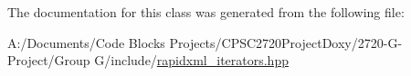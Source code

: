 The documentation for this class was generated from the following file\+:\begin{DoxyCompactItemize}
\item 
A\+:/\+Documents/\+Code Blocks Projects/\+C\+P\+S\+C2720\+Project\+Doxy/2720-\/\+G-\/\+Project/\+Group G/include/\mbox{\hyperlink{include_2rapidxml__iterators_8hpp}{rapidxml\+\_\+iterators.\+hpp}}\end{DoxyCompactItemize}

